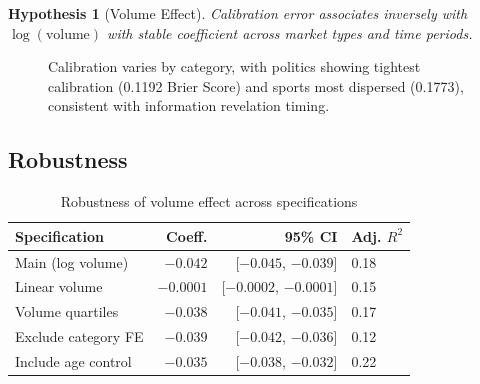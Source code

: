 \documentclass[a4paper,11pt]{article}
\theoremstyle{plain}
\newtheorem{hypothesis}[section]{Hypothesis}
\theoremstyle{definition}
\begin{document}
\begin{hypothesis}[Volume Effect]
Calibration error associates inversely with $\log(\text{volume})$ with stable coefficient across market types and time periods.
\end{hypothesis}

\begin{figure}[h]
\centering
\small
{}
\caption{Calibration varies by category, with politics showing tightest calibration (0.1192 Brier Score) and sports most dispersed (0.1773), consistent with information revelation timing.}
\label{fig:brier_by_category}
\end{figure}

\subsection{Robustness}

\begin{table}[h]
\centering
\small
\caption{Robustness of volume effect across specifications}
\begin{tabular}{lrrl}
\toprule
Specification & Coeff. & 95\% CI & Adj. $R^2$ \\
\midrule
Main (log volume) & $-0.042$ & [$-0.045$, $-0.039$] & 0.18 \\
Linear volume & $-0.0001$ & [$-0.0002$, $-0.0001$] & 0.15 \\
Volume quartiles & $-0.038$ & [$-0.041$, $-0.035$] & 0.17 \\
Exclude category FE & $-0.039$ & [$-0.042$, $-0.036$] & 0.12 \\
Include age control & $-0.035$ & [$-0.038$, $-0.032$] & 0.22 \\
\bottomrule
\end{tabular}
\end{table}
\end{document}
